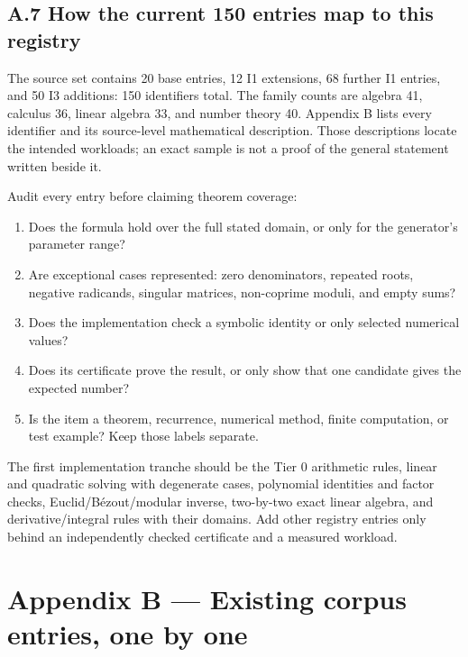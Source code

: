 \documentclass[
  10pt,
]{article}
\providecommand{\tightlist}{%
  \setlength{\itemsep}{0pt}\setlength{\parskip}{0pt}}
\begin{document}
\subsection{A.7 How the current 150 entries map to this
registry}\label{a.7-how-the-current-150-entries-map-to-this-registry}

The source set contains 20 base entries, 12 I1 extensions, 68 further I1
entries, and 50 I3 additions: 150 identifiers total. The family counts
are algebra 41, calculus 36, linear algebra 33, and number theory 40.
Appendix B lists every identifier and its source-level mathematical
description. Those descriptions locate the intended workloads; an exact
sample is not a proof of the general statement written beside it.

Audit every entry before claiming theorem coverage:

\begin{enumerate}
\def\labelenumi{\arabic{enumi}.}
\tightlist
\item
  Does the formula hold over the full stated domain, or only for the
  generator's parameter range?
\item
  Are exceptional cases represented: zero denominators, repeated roots,
  negative radicands, singular matrices, non-coprime moduli, and empty
  sums?
\item
  Does the implementation check a symbolic identity or only selected
  numerical values?
\item
  Does its certificate prove the result, or only show that one candidate
  gives the expected number?
\item
  Is the item a theorem, recurrence, numerical method, finite
  computation, or test example? Keep those labels separate.
\end{enumerate}

The first implementation tranche should be the Tier 0 arithmetic rules,
linear and quadratic solving with degenerate cases, polynomial
identities and factor checks, Euclid/Bézout/modular inverse, two-by-two
exact linear algebra, and derivative/integral rules with their domains.
Add other registry entries only behind an independently checked
certificate and a measured workload.

\section{Appendix B --- Existing corpus entries, one by
one}\label{appendix-b-existing-corpus-entries-one-by-one}
\end{document}
